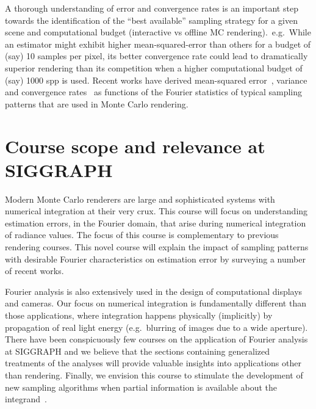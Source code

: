 \documentclass{acmsiggraph}
\begin{document}
A thorough understanding of error and convergence rates is an important step towards the identification of the ``best available'' sampling strategy for a given scene and computational budget (interactive vs offline MC rendering).~e.g.~While an estimator might exhibit higher mean-squared-error than others for a budget of (say) 10 samples per pixel, its better convergence rate could lead to dramatically superior rendering than its competition when a higher computational budget of (say) 1000 spp is used.
Recent works have derived mean-squared error~\cite{durand2011frequency,Ramamoorthi:2012}, variance~\cite{Subr:2013:FAS,subr14error} and convergence rates~\cite{Pilleboue:2015:VAM} as functions of the Fourier statistics of typical sampling patterns that are used in Monte Carlo rendering. 

\section{Course scope and relevance at SIGGRAPH}
Modern Monte Carlo renderers are large and sophisticated systems with numerical integration at their very crux. This course will focus on understanding estimation errors, in the Fourier domain, that arise during numerical integration of radiance values. The focus of this course is complementary to previous rendering courses. This novel course will explain the impact of sampling patterns with desirable Fourier characteristics on estimation error by surveying a number of recent works.

Fourier analysis is also extensively used in the design of computational displays and cameras. Our focus on numerical integration is fundamentally different than those applications, where integration happens physically (implicitly) by propagation of real light energy  (e.g.~blurring of images due to a wide aperture). There have been conspicuously few courses on the application of Fourier analysis at SIGGRAPH and we believe that the sections containing generalized treatments of the analyses will provide valuable insights into applications other than rendering. Finally, we envision this course to stimulate the development of new sampling algorithms when partial information is available about the integrand~\cite{Cov5D}.
\end{document}
